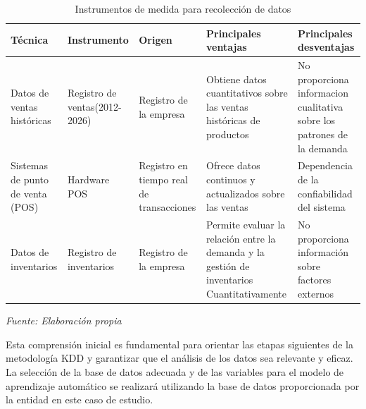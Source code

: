 		\begin{table}[H]
			\centering
			\caption{Instrumentos de medida para recolección de datos}
			\begin{tabular}{|L{2.7cm}|L{2.5cm}|C{2cm}|C{3.5cm}|C{3.5cm}|}
				\hline 
				Técnica & Instrumento & Origen & Principales ventajas & Principales desventajas\\
				\hline \hline
				Datos de ventas históricas & Registro de ventas(2012-2026) & Registro de la empresa & Obtiene datos cuantitativos sobre las ventas históricas de productos & No proporciona informacion cualitativa sobre los patrones de la demanda  \\
				\hline
				Sistemas de punto de venta (POS) & Hardware POS & Registro en tiempo real de transacciones & Ofrece datos continuos y actualizados sobre las ventas & Dependencia de la confiabilidad del sistema \\
				\hline
				Datos de inventarios & Registro de inventarios & Registro de la empresa & Permite evaluar la relación entre la demanda y la gestión de inventarios Cuantitativamente & No proporciona información sobre factores externos\\
				\hline
				
			\end{tabular}
			\newline
			\newline \textit{Fuente: Elaboración propia}
		\end{table}
		
		Esta comprensión inicial es fundamental para orientar las etapas siguientes de la metodología KDD y garantizar que el análisis de los datos sea relevante y eficaz. La selección de la base de datos adecuada y de las variables para el modelo de aprendizaje automático se realizará utilizando la base de datos proporcionada por la entidad en este caso de estudio.
		
		
		
